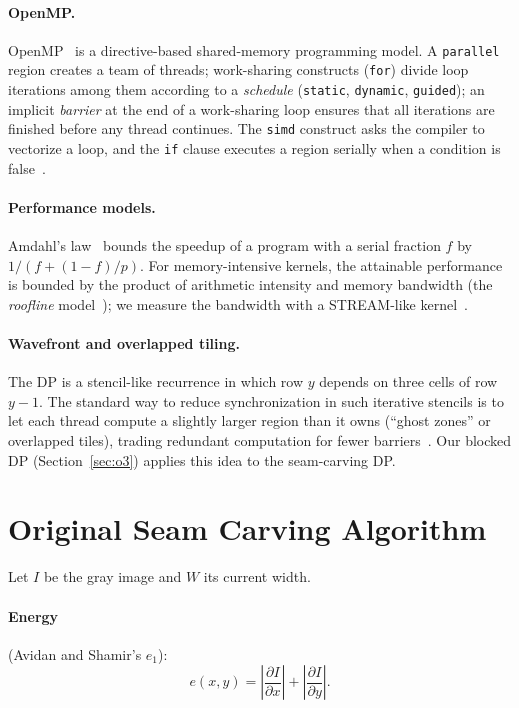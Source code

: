 \documentclass[11pt,a4paper]{article}
\begin{document}
\paragraph{OpenMP.} OpenMP~\cite{openmp52} is a directive-based shared-memory programming model. A
\texttt{parallel} region creates a team of threads; work-sharing constructs (\texttt{for}) divide loop
iterations among them according to a \emph{schedule} (\texttt{static}, \texttt{dynamic},
\texttt{guided}); an implicit \emph{barrier} at the end of a work-sharing loop ensures that all iterations
are finished before any thread continues. The \texttt{simd} construct asks the compiler to vectorize a
loop, and the \texttt{if} clause executes a region serially when a condition is false~\cite{chapman2008}.

\paragraph{Performance models.} Amdahl's law~\cite{amdahl1967} bounds the speedup of a program with a
serial fraction $f$ by $1/(f+(1-f)/p)$. For memory-intensive kernels, the attainable performance is
bounded by the product of arithmetic intensity and memory bandwidth (the \emph{roofline}
model~\cite{williams2009}); we measure the bandwidth with a STREAM-like kernel~\cite{mccalpin1995}.

\paragraph{Wavefront and overlapped tiling.} The DP is a stencil-like recurrence in which row $y$ depends
on three cells of row $y-1$. The standard way to reduce synchronization in such iterative stencils is to
let each thread compute a slightly larger region than it owns (``ghost zones'' or overlapped tiles),
trading redundant computation for fewer barriers~\cite{meng2009}. Our blocked DP
(Section~\ref{sec:o3}) applies this idea to the seam-carving DP.

\section{Original Seam Carving Algorithm}
\label{sec:algo}

Let $I$ be the gray image and $W$ its current width.

\paragraph{Energy} (Avidan and Shamir's $e_1$):
\[
  e(x,y) = \left|\frac{\partial I}{\partial x}\right| + \left|\frac{\partial I}{\partial y}\right| .
\]
\end{document}
